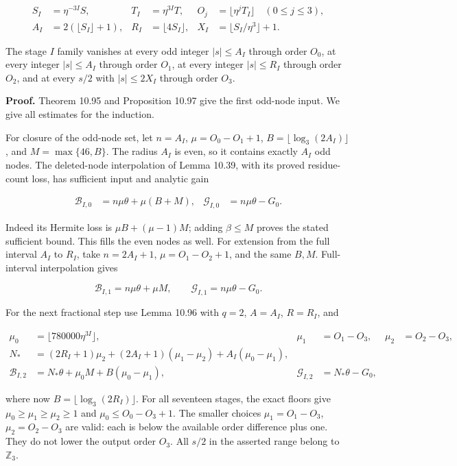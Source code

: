\documentclass[
  11pt,
  a4paper,
]{article}
\begin{document}
\[
\begin{aligned}
S_I&=\eta^{-3I}S,& T_I&=\eta^{3I}T,&
O_j&=\lfloor\eta^jT_I\rfloor\quad(0\le j\le3),\\
A_I&=2(\lfloor S_I\rfloor+1),&
R_I&=\lfloor4S_I\rfloor,&
X_I&=\lfloor S_I/\eta^3\rfloor+1 .
\end{aligned}
\tag{10.255}
\]

The stage \(I\) family vanishes at every odd integer \(|s|\le A_I\)
through order \(O_0\), at every integer \(|s|\le A_I\) through order
\(O_1\), at every integer \(|s|\le R_I\) through order \(O_2\), and at
every \(s/2\) with \(|s|\le2X_I\) through order \(O_3\).

\textbf{Proof.} Theorem 10.95 and Proposition 10.97 give the first
odd-node input. We give all estimates for the induction.

For closure of the odd-node set, let \(n=A_I\), \(\mu=O_0-O_1+1\),
\(B=\lfloor\log_3(2A_I)\rfloor\), and \(M=\max\{46,B\}\). The radius
\(A_I\) is even, so it contains exactly \(A_I\) odd nodes. The
deleted-node interpolation of Lemma 10.39, with its proved residue-count
loss, has sufficient input and analytic gain

\[
\begin{aligned}
\mathcal B_{I,0}&=n\mu\theta+\mu(B+M),&
\mathcal G_{I,0}&=n\mu\theta-G_0.
\end{aligned}
\tag{10.256}
\]

Indeed its Hermite loss is \(\mu B+(\mu-1)M\); adding \(\beta\le M\)
proves the stated sufficient bound. This fills the even nodes as well.
For extension from the full interval \(A_I\) to \(R_I\), take
\(n=2A_I+1\), \(\mu=O_1-O_2+1\), and the same \(B,M\). Full-interval
interpolation gives

\[
\mathcal B_{I,1}=n\mu\theta+\mu M,\qquad
\mathcal G_{I,1}=n\mu\theta-G_0.
\tag{10.257}
\]

For the next fractional step use Lemma 10.96 with \(q=2\), \(A=A_I\),
\(R=R_I\), and

\[
\begin{aligned}
\mu_0&=\lfloor780000\eta^{3I}\rfloor,&
\mu_1&=O_1-O_3,&\mu_2&=O_2-O_3,\\
N_*&=(2R_I+1)\mu_2+(2A_I+1)(\mu_1-\mu_2)
+A_I(\mu_0-\mu_1),\\
\mathcal B_{I,2}&=N_*\theta+\mu_0M+B(\mu_0-\mu_1),&
\mathcal G_{I,2}&=N_*\theta-G_0,
\end{aligned}
\tag{10.258}
\]

where now \(B=\lfloor\log_3(2R_I)\rfloor\). For all seventeen stages,
the exact floors give \(\mu_0\ge\mu_1\ge\mu_2\ge1\) and
\(\mu_0\le O_0-O_3+1\). The smaller choices \(\mu_1=O_1-O_3\),
\(\mu_2=O_2-O_3\) are valid: each is below the available order
difference plus one. They do not lower the output order \(O_3\). All
\(s/2\) in the asserted range belong to \(\mathbb Z_3\).
\end{document}
